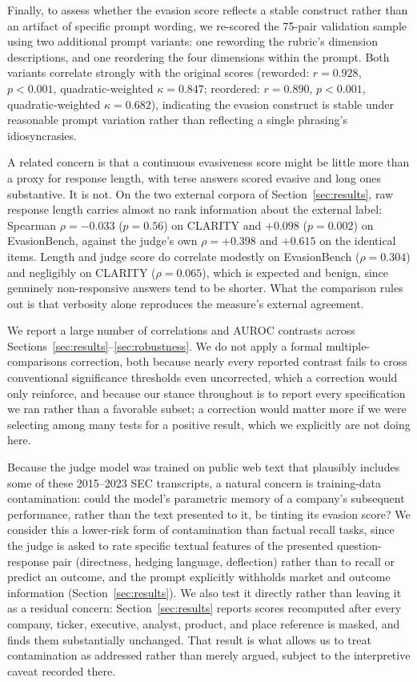 \documentclass[conference]{IEEEtran}
\begin{document}
Finally, to assess whether the evasion score reflects a stable construct rather than an artifact of specific prompt wording, we re-scored the 75-pair validation sample using two additional prompt variants: one rewording the rubric's dimension descriptions, and one reordering the four dimensions within the prompt. Both variants correlate strongly with the original scores (reworded: $r = 0.928$, $p < 0.001$, quadratic-weighted $\kappa = 0.847$; reordered: $r = 0.890$, $p < 0.001$, quadratic-weighted $\kappa = 0.682$), indicating the evasion construct is stable under reasonable prompt variation rather than reflecting a single phrasing's idiosyncrasies.

A related concern is that a continuous evasiveness score might be little more than a proxy for response length, with terse answers scored evasive and long ones substantive. It is not. On the two external corpora of Section~\ref{sec:results}, raw response length carries almost no rank information about the external label: Spearman $\rho = -0.033$ ($p = 0.56$) on CLARITY and $+0.098$ ($p = 0.002$) on EvasionBench, against the judge's own $\rho = +0.398$ and $+0.615$ on the identical items. Length and judge score do correlate modestly on EvasionBench ($\rho = 0.304$) and negligibly on CLARITY ($\rho = 0.065$), which is expected and benign, since genuinely non-responsive answers tend to be shorter. What the comparison rules out is that verbosity alone reproduces the measure's external agreement.

We report a large number of correlations and AUROC contrasts across Sections~\ref{sec:results}--\ref{sec:robustness}. We do not apply a formal multiple-comparisons correction, both because nearly every reported contrast fails to cross conventional significance thresholds even uncorrected, which a correction would only reinforce, and because our stance throughout is to report every specification we ran rather than a favorable subset; a correction would matter more if we were selecting among many tests for a positive result, which we explicitly are not doing here.

Because the judge model was trained on public web text that plausibly includes some of these 2015--2023 SEC transcripts, a natural concern is training-data contamination: could the model's parametric memory of a company's subsequent performance, rather than the text presented to it, be tinting its evasion score? We consider this a lower-risk form of contamination than factual recall tasks, since the judge is asked to rate specific textual features of the presented question-response pair (directness, hedging language, deflection) rather than to recall or predict an outcome, and the prompt explicitly withholds market and outcome information (Section~\ref{sec:results}). We also test it directly rather than leaving it as a residual concern: Section~\ref{sec:results} reports scores recomputed after every company, ticker, executive, analyst, product, and place reference is masked, and finds them substantially unchanged. That result is what allows us to treat contamination as addressed rather than merely argued, subject to the interpretive caveat recorded there.
\end{document}
